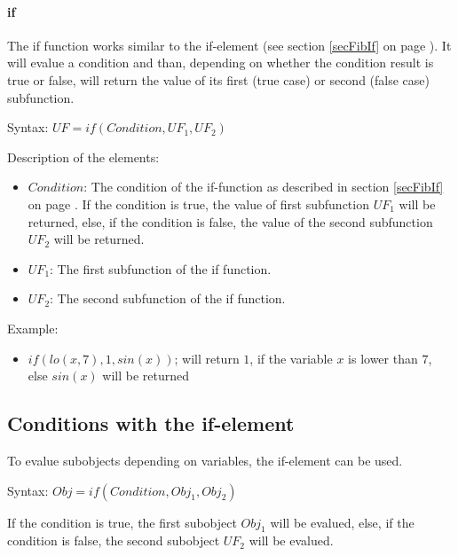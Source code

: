 \paragraph{if}

The if function works similar to the if-element (see section \ref{secFibIf} on page \pageref{secFibIf}). It will evalue a condition and than, depending on whether the condition result is true or false, will return the value of its first (true case) or second (false case) subfunction.

\bigskip\noindent
Syntax:
$UF=if( Condition, UF_1, UF_2 )$

\bigskip\noindent
Description of the elements:
\begin{itemize}
 \item $Condition$: The condition of the if-function as described in section \ref{secFibIf} on page \pageref{secFibIf}. If the condition is true, the value of first subfunction $UF_1$ will be returned, else, if the condition is false, the value of the second subfunction $UF_2$ will be returned.
 \item $UF_1$: The first subfunction of the if function.
 \item $UF_2$: The second subfunction of the if function.
\end{itemize}

\bigskip\noindent
Example:
\begin{itemize}
 \item $if( lo(x,7), 1, sin(x) )$; will return $1$, if the variable $x$ is lower than $7$, else $sin(x)$ will be returned
\end{itemize}



\subsection{Conditions with the if-element}
\label{secFibIf}

To evalue subobjects depending on variables, the if-element can be used.

\bigskip\noindent
Syntax:
$Obj=if( Condition, Obj_1, Obj_2)$

If the condition is true, the first subobject $Obj_1$ will be evalued, else, if the condition is false, the second subobject $UF_2$ will be evalued.

